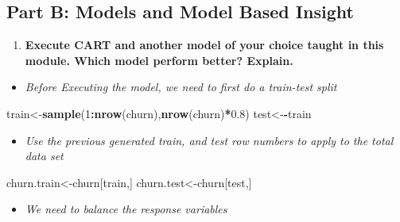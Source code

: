 \documentclass[]{article}
\newenvironment{Shaded}{\begin{snugshade}}{\end{snugshade}}
\newcommand{\DecValTok}[1]{\textcolor[rgb]{0.00,0.00,0.81}{#1}}
\newcommand{\FloatTok}[1]{\textcolor[rgb]{0.00,0.00,0.81}{#1}}
\newcommand{\KeywordTok}[1]{\textcolor[rgb]{0.13,0.29,0.53}{\textbf{#1}}}
\newcommand{\NormalTok}[1]{#1}
\newcommand{\OperatorTok}[1]{\textcolor[rgb]{0.81,0.36,0.00}{\textbf{#1}}}
\newcommand{\StringTok}[1]{\textcolor[rgb]{0.31,0.60,0.02}{#1}}
\providecommand{\tightlist}{%
  \setlength{\itemsep}{0pt}\setlength{\parskip}{0pt}}
\begin{document}
\hypertarget{part-b-models-and-model-based-insight}{%
\subsection{Part B: Models and Model Based
Insight}\label{part-b-models-and-model-based-insight}}

\begin{enumerate}
\def\labelenumi{\arabic{enumi}.}
\setcounter{enumi}{2}
\tightlist
\item
  \textbf{Execute CART and another model of your choice taught in this
  module. Which model perform better? Explain.}
\end{enumerate}

\begin{itemize}
\tightlist
\item
  \emph{Before Executing the model, we need to first do a train-test
  split}
\end{itemize}

\begin{Shaded}
\begin{Highlighting}[]
\NormalTok{train<-}\KeywordTok{sample}\NormalTok{(}\DecValTok{1}\OperatorTok{:}\KeywordTok{nrow}\NormalTok{(churn),}\KeywordTok{nrow}\NormalTok{(churn)}\OperatorTok{*}\FloatTok{0.8}\NormalTok{)}
\NormalTok{test<-}\OperatorTok{-}\NormalTok{train}
\end{Highlighting}
\end{Shaded}

\begin{itemize}
\tightlist
\item
  \emph{Use the previous generated train, and test row numbers to apply
  to the total data set}
\end{itemize}

\begin{Shaded}
\begin{Highlighting}[]
\NormalTok{churn.train<-churn[train,]}
\NormalTok{churn.test<-churn[test,]}
\end{Highlighting}
\end{Shaded}

\begin{itemize}
\tightlist
\item
  \emph{We need to balance the response variables}
\end{itemize}

\begin{Shaded}
\end{Shaded}
\end{document}
